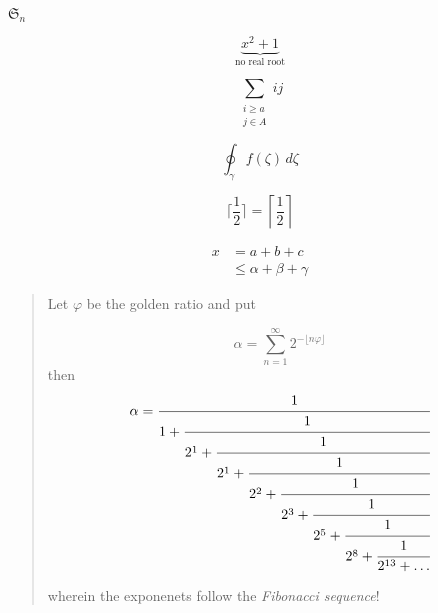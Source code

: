 \documentclass{article}
\begin{document}
    $\mathfrak{S}_n$

    \begin{displaymath}
        \underbrace{x^2+1}_{\text{no real root}}
    \end{displaymath}


    \begin{equation}
        \sum_{\substack{i \geq a \\ j \in A}} ij
    \end{equation}


    \begin{equation}
        \boxed{\oint _{\gamma} f(\zeta) \, d\zeta}
    \end{equation}

    \begin{equation}
        \lceil \frac{1}{2} \rceil = \left\lceil \frac{1}{2} \right\rceil
    \end{equation}
    

    \begin{align}
        x &= a + b + c \\
          &\leq \alpha + \beta + \gamma
    \end{align}


    \begin{abstract}
        \noindent
        Let $\varphi$ be the golden ratio and put 

        \[\alpha = \sum_{n=1}^\infty 2^{-\lfloor n\varphi \rfloor}\]
        then 
        \[
            \alpha = \cfrac{1}{1+\cfrac{1}{2^1+\cfrac{1}{2^1+\cfrac{1}{2^2+\cfrac{1}{2^3+\cfrac{1}{2^5+\cfrac{1}{2^8+\cfrac{1}{2^{13}+\dots}}}}}}}}
        \]
        
        \noindent wherein the exponenets follow the \emph{Fibonacci sequence}!
    \end{abstract}
\end{document}
